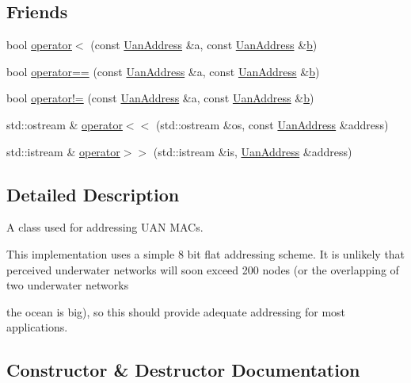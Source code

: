 \subsection*{Friends}
\begin{DoxyCompactItemize}
\item 
bool \hyperlink{classns3_1_1UanAddress_a3f829b559df0b2a232ec2c71b327b0d5}{operator$<$} (const \hyperlink{classns3_1_1UanAddress}{Uan\+Address} \&a, const \hyperlink{classns3_1_1UanAddress}{Uan\+Address} \&\hyperlink{lte__pathloss_8m_a21ad0bd836b90d08f4cf640b4c298e7c}{b})
\item 
bool \hyperlink{classns3_1_1UanAddress_a9506bf6174d7f538724fe4ea489b9f36}{operator==} (const \hyperlink{classns3_1_1UanAddress}{Uan\+Address} \&a, const \hyperlink{classns3_1_1UanAddress}{Uan\+Address} \&\hyperlink{lte__pathloss_8m_a21ad0bd836b90d08f4cf640b4c298e7c}{b})
\item 
bool \hyperlink{classns3_1_1UanAddress_a9c35c58af2a0adde8b10cd52b404254d}{operator!=} (const \hyperlink{classns3_1_1UanAddress}{Uan\+Address} \&a, const \hyperlink{classns3_1_1UanAddress}{Uan\+Address} \&\hyperlink{lte__pathloss_8m_a21ad0bd836b90d08f4cf640b4c298e7c}{b})
\item 
std\+::ostream \& \hyperlink{classns3_1_1UanAddress_a8016a9bd1f8ccdc0346f18f4ac541284}{operator$<$$<$} (std\+::ostream \&os, const \hyperlink{classns3_1_1UanAddress}{Uan\+Address} \&address)
\item 
std\+::istream \& \hyperlink{classns3_1_1UanAddress_ad09ebd88a572d030c5ea8d3a4e58ccb3}{operator$>$$>$} (std\+::istream \&is, \hyperlink{classns3_1_1UanAddress}{Uan\+Address} \&address)
\end{DoxyCompactItemize}


\subsection{Detailed Description}
A class used for addressing U\+AN M\+AC\textquotesingle{}s.

This implementation uses a simple 8 bit flat addressing scheme. It is unlikely that perceived underwater networks will soon exceed 200 nodes (or the overlapping of two underwater networks
\begin{DoxyItemize}
\item the ocean is big), so this should provide adequate addressing for most applications. 
\end{DoxyItemize}

\subsection{Constructor \& Destructor Documentation}

